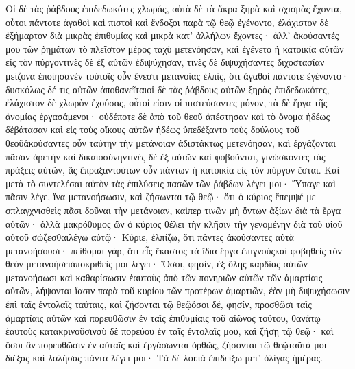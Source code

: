 Οἱ δὲ τὰς ῥάβδους ἐπιδεδωκότες χλωράς, αὐτὰ δὲ τὰ ἄκρα ξηρὰ καὶ σχισμὰς ἔχοντα, οὗτοι πάντοτε ἀγαθοὶ καὶ πιστοὶ καὶ ἔνδοξοι παρὰ τῷ θεῷ ἐγένοντο, ἐλάχιστον δὲ ἐξήμαρτον διὰ μικρὰς ἐπιθυμίας καὶ μικρὰ κατ’ ἀλλήλων ἔχοντες· ἀλλ’ ἀκούσαντές μου τῶν ῥημάτων τὸ πλεῖστον μέρος ταχὺ μετενόησαν, καὶ ἐγένετο ἡ κατοικία αὐτῶν εἰς τὸν πύργοντινὲς δὲ ἐξ αὐτῶν ἐδιψύχησαν, τινὲς δὲ διψυχήσαντες διχοστασίαν μείζονα ἐποίησανἐν τούτοῖς οὖν ἔνεστι μετανοίας ἐλπίς, ὅτι ἀγαθοὶ πάντοτε ἐγένοντο· δυσκόλως δέ τις αὐτῶν ἀποθανεῖταιοἱ δὲ τὰς ῥάβδους αὐτῶν ξηρὰς ἐπιδεδωκότες, ἐλάχιστον δὲ χλωρὸν ἐχούσας, οὗτοί εἰσιν οἱ πιστεύσαντες μόνον, τὰ δὲ ἔργα τῆς ἀνομίας ἐργασάμενοι· οὐδέποτε δὲ ἀπὸ τοῦ θεοῦ ἀπέστησαν καὶ τὸ ὄνομα ἡδέως δ̓ἐβάτασαν καὶ εἰς τοὺς οἴκους αὐτῶν ἡδέως ὑπεδέξαντο τοὺς δούλους τοῦ θεοῦἀκούσαντες οὖν ταύτην τὴν μετάνοιαν ἀδιστάκτως μετενόησαν, καὶ ἐργάζονται πᾶσαν ἀρετὴν καὶ δικαιοσύνηντινὲς δὲ ἐξ αὐτῶν καὶ φοβοῦνται, γινώσκοντες τὰς πράξεις αὐτῶν, ἃς ἔπραξαντούτων οὖν πάντων ἡ κατοικία εἰς τὸν πύργον ἔσται.
Καὶ μετὰ τὸ συντελέσαι αὐτὸν τὰς ἐπιλύσεις πασῶν τῶν ῥάβδων λέγει μοι· Ὕπαγε καὶ πᾶσιν λέγε, ἵνα μετανοήσωσιν, καὶ ζήσωνται τῷ θεῷ· ὅτι ὁ κύριος ἔπεμψέ με σπλαγχνισθεὶς πᾶσι δοῦναι τὴν μετάνοιαν, καὶπερ τινῶν μὴ ὄντων ἀξίων διὰ τὰ ἔργα αὐτῶν· ἀλλὰ μακρόθυμος ὢν ὁ κύριος θέλει τὴν κλῆσιν τὴν γενομένην διὰ τοῦ υἱοῦ αὐτοῦ σώζεσθαιλέγω αὐτῷ· Κύριε, ἐλπίζω, ὅτι πάντες ἀκούσαντες αὐτὰ μετανοήσουσι· πείθομαι γάρ, ὅτι εἷς ἕκαστος τὰ ἴδια ἔργα ἐπιγνοὺςκαὶ φοβηθεὶς τὸν θεὸν μετανοήσειἀποκριθείς μοι λέγει· Ὅσοι, φησίν, ἐξ ὅλης καρδίας αὐτῶν μετανοήσωσι καὶ καθαρίσωσιν ἑαυτοὺς ἀπὸ τῶν πονηριῶν αὐτῶν τῶν ἁμαρτίαις αὐτῶν, λήψονται ἴασιν παρὰ τοῦ κυρίου τῶν προτέρων ἁμαρτιῶν, ἐὰν μὴ διψυχήσωσιν ἐπὶ ταῖς ἐντολαῖς ταύταις, καὶ ζήσονται τῷ θεῷὅσοι δέ, φησίν, προσθῶσι ταῖς ἁμαρτίαις αὐτῶν καὶ πορευθῶσιν ἐν ταῖς ἐπιθυμίαις τοῦ αἰῶνος τούτου, θανάτῳ ἑαυτοὺς κατακρινοῦσινσὺ δὲ πορεύου ἐν ταῖς ἐντολαῖς μου, καὶ ζήσῃ τῷ θεῷ· καὶ ὅσοι ἂν πορευθῶσιν ἐν αὐταῖς καὶ ἐργάσωνται ὀρθῶς, ζήσονται τῷ θεῷταῦτά μοι διέξας καὶ λαλήσας πάντα λέγει μοι· Τὰ δὲ λοιπὰ ἐπιδείξω μετ’ ὀλίγας ἡμέρας.

